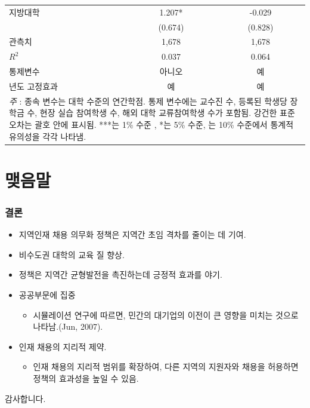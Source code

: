 \documentclass[aspectratio=169,xcolor=dvipsnames,handout]{beamer}
\begin{document}
\begin{frame}[allowframebreaks]
\begin{table}
\begin{tabular}{lcc}
        지방대학                      & 1.207*   & -0.029   \\
                                                & (0.674)  & (0.828)  \\
        \midrule
        관측치                              & 1,678    & 1,678    \\
        $R^2$                                 & 0.037    & 0.064    \\
        통제변수                                  & 아니오       & 예      \\
        년도 고정효과                                   & 예      & 예      \\
        \bottomrule
        \multicolumn{3}{p{6cm}}{\tiny\textit{주} : 종속 변수는 대학 수준의 연간학점. 통제 변수에는 교수진 수, 등록된 학생당 장학금 수, 현장 실습 참여학생 수, 해외 대학 교류참여학생 수가 포함됨. 강건한 표준 오차는 괄호 안에 표시됨. ***는 1\% 수준 , *는 5\% 수준, 는 10\% 수준에서 통계적 유의성을 각각 나타냄.} \\
        \end{tabular}
    \end{table}
\end{frame}

\section{맺음말}%
\begin{frame}
    \frametitle{결론}
    \begin{itemize}[<+->]
        \item 지역인재 채용 의무화 정책은 지역간 초임 격차를 줄이는 데 기여.
        \item 비수도권 대학의 교육 질 향상.
        \item 정책은 지역간 균형발전을 촉진하는데 긍정적 효과를 야기.
        \item 공공부문에 집중
        \begin{itemize}
            \item 시뮬레이션 연구에 따르면, 민간의 대기업의 이전이 큰 영향을 미치는 것으로 나타남.(Jun, 2007).
        \end{itemize}
        \item 인재 채용의 지리적 제약.
        \begin{itemize}
            \item 인재 채용의 지리적 범위를 확장하여, 다른 지역의 지원자와 채용을 허용하면 정책의 효과성을 높일 수 있음.
        \end{itemize}
    \end{itemize}
\end{frame}

\begin{frame}
    \centering
    \huge
    감사합니다.
\end{frame}


\end{document}
